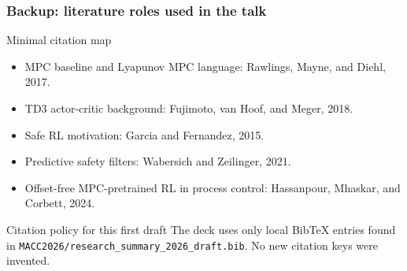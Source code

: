 \documentclass[aspectratio=169]{beamer}
\begin{document}
\begin{frame}
\frametitle{\large \textbf{Backup: literature roles used in the talk}}
\scriptsize

\begin{block}{Minimal citation map}
\begin{itemize}\justifying
  \setlength\itemsep{0.45ex}
  \item MPC baseline and Lyapunov MPC language: Rawlings, Mayne, and Diehl, 2017.
  \item TD3 actor-critic background: Fujimoto, van Hoof, and Meger, 2018.
  \item Safe RL motivation: Garcia and Fernandez, 2015.
  \item Predictive safety filters: Wabersich and Zeilinger, 2021.
  \item Offset-free MPC-pretrained RL in process control: Hassanpour, Mhaskar, and Corbett, 2024.
\end{itemize}
\end{block}

\begin{block}{Citation policy for this first draft}
\justifying
The deck uses only local BibTeX entries found in \texttt{MACC2026/research\_summary\_2026\_draft.bib}. No new citation keys were invented.
\end{block}
\end{frame}
\end{document}
